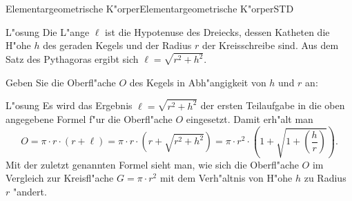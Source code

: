\begin{MXContent}{Elementargeometrische K"orper}{Elementargeometrische K"orper}{STD}
\begin{MExercise}
\begin{MExerciseItems}
\begin{MHint}{L"osung}
Die L"ange $\ell$ ist die Hypotenuse des Dreiecks, dessen Katheten die H"ohe
$h$ des geraden Kegels und der Radius $r$ der Kreisschreibe sind. Aus dem Satz
des Pythagoras ergibt sich $\ell = \sqrt{r^2 + h^2}$.
\end{MHint}

\item
Geben Sie die Oberfl"ache $O$ des Kegels in Abh"angigkeit von $h$ und $r$ an:
\par

\begin{MHint}{L"osung}
Es wird das Ergebnis $\ell = \sqrt{r^2 + h^2}$ der ersten Teilaufgabe in die 
oben angegebene Formel f"ur die Oberfl"ache $O$ eingesetzt. Damit erh"alt man
\[
O = \pi \cdot r \cdot (r + \ell) %
 = \pi \cdot r \cdot \left(r + \sqrt{r^2 + h^2}\right) %
 = \pi \cdot r^2 \cdot \left(1 + \sqrt{1 + \left(\frac{h}{r}\right)} \right). %
\]
Mit der zuletzt genannten Formel sieht man, wie sich die Oberfl"ache $O$ im 
Vergleich zur Kreisfl"ache $G = \pi \cdot r^2$ mit dem Verh"altnis von H"ohe $h$
zu Radius $r$ "andert.
\end{MHint}
\end{MExerciseItems}
\end{MExercise}

\end{MXContent}


